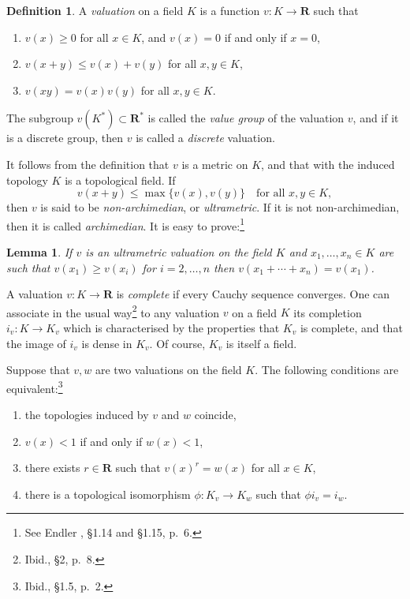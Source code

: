 \documentclass[10pt]{article}
\newtheorem{lemm}[theo]{Lemma}
\theoremstyle{definition}
\newtheorem{defi}[theo]{Definition}
\def\RR{\mathbf{R}}
\def\fnthsi{See Endler \cite{bib:58}, \S1.14 and \S1.15, p.~6.}
\def\fnthse{Ibid., \S2, p.~8.}
\def\fnthei{Ibid., \S1.5, p.~2.}
\begin{document}
\begin{defi}
\label{4.1.1}
A \emph{valuation} on a field $K$ is a function $v : K \to \RR$ such that
\begin{enumerate}
\item
\label{4.1.1.1}
$v(x) \geq 0$ for all $x \in K$, and $v(x) = 0$ if and only if $x = 0$,

\item
\label{4.1.1.2}
$v(x + y) \leq v(x) + v(y)$ for all $x,y \in K$,

\item
\label{4.1.1.3}
$v(xy) = v(x) v(y)$ for all $x,y \in K$.
\end{enumerate}
\end{defi}


The subgroup $v(K^*) \subset \RR^*$ is called the \emph{value group} of the valuation $v$, and if it is a discrete group, then $v$ is called a \emph{discrete} valuation.

It follows from the definition that $v$ is a metric on $K$, and that with the induced topology $K$ is a topological field.
If
\begin{equation}
\label{4.1.1.4}
v(x + y) \leq \max\{v(x), v(y) \}
\quad
\text{for all $x,y \in K$},
\end{equation}
then $v$ is said to be \emph{non-archimedian}, or \emph{ultrametric}.
If it is not non-archimedian, then it is called \emph{archimedian}.
It is easy to prove:\footnote{\fnthsi}


\begin{lemm}
\label{4.1.2}
If $v$ is an ultrametric valuation on the field $K$ and $x_1,\ldots,x_n \in K$ are such that $v(x_1) \geq v(x_i)$ for $i=2,\ldots,n$ then $v(x_1 + \cdots + x_n) = v(x_1)$.
\end{lemm}

A valuation $v : K \to \RR$ is \emph{complete} if every Cauchy sequence converges.
One can associate in the usual way\footnote{\fnthse} to any valuation $v$ on a field $K$ its completion $i_v : K \to K_v$ which is characterised by the properties that $K_v$ is complete, and that the image of $i_v$ is dense in $K_v$.
Of course, $K_v$ is itself a field.

Suppose that $v,w$ are two valuations on the field $K$.
The following conditions are equivalent:\footnote{\fnthei}
\begin{enumerate}
\item
\label{4.1.3.1}
the topologies induced by $v$ and $w$ coincide,

\item
\label{4.1.3.2}
$v(x) < 1$ if and only if $w(x) < 1$,

\item
\label{4.1.3.3}
there exists $r \in \RR$ such that $v(x)^r = w(x)$ for all $x \in K$,

\item
\label{4.1.3.4}
there is a topological isomorphism $\phi : K_v \to K_w$ such that $\phi i_v = i_w$.
\end{enumerate}
\end{document}
